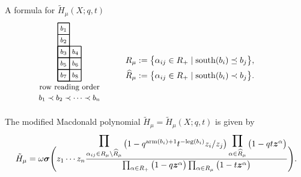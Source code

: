 \documentclass[dvipsnames]{beamer}
\newcommand{\zz}{{\boldsymbol z}}
\newcommand{\sigmabold}{\boldsymbol \sigma}
\newcommand{\Htild}{\tilde{H}}
\DeclareMathOperator{\pol}{pol}
\newcommand{\south}{{\mathrm{south}}}
\newcommand{\leg}{{\mathrm{leg}}}
\newcommand{\arm}{{\mathrm{arm}}}
\theoremstyle{definition}
\begin{document}
\begin{frame}{A formula for \(\Htild_\mu(X;q,t)\)}
  \begin{align*}
\quad \ \ \
\begin{tikzpicture}[scale = .49]
\begin{scope}
\draw[thick] (0,0) grid (1,5);
\draw[thick] (0,0) grid (2,3);
\node at (0.5, 4.5) { \footnotesize $b_1$};
\node at (0.5, 3.5) { \footnotesize $b_2$};
\node at (0.5, 2.5) { \footnotesize $b_3$};
\node at (1.5, 2.5) { \footnotesize $b_4$};
\node at (0.5, 1.5) { \footnotesize $b_5$};
\node at (1.5, 1.5) { \footnotesize $b_6$};
\node at (0.5, 0.5) { \footnotesize $b_7$};
\node at (1.5, 0.5) { \footnotesize $b_8$};
\node at (1,-.54) {\small row reading order };
\node at (1,-1.44) {\small $b_1 \prec b_2 \prec \cdots  \prec b_n$};
\end{scope}
\end{tikzpicture}
\quad  \quad \ \
\raisebox{14mm}{\parbox{7cm}{
 $R_\mu     :=     \big\{ \alpha_{ij} \in R_+ \mid  \south(b_i) \preceq  b_j \big\},$ \\[1.4mm]
$\widehat{R}_\mu  :=  \big\{ \alpha_{ij} \in R_+ \mid  \south(b_i) \prec b_j \big\}$.}}
\end{align*}

\vspace{-4.3mm}
\pause
\begin{theorem}
The modified Macdonald polynomial $\Htild_\mu = \Htild_{\mu }(X;q,t)$ is given by
\vspace{-1mm}
{\small \begin{align*}
          \Htild_\mu =
          \omega \sigmabold \Bigg( z_1 \cdots z_n
\frac{
\displaystyle\prod_{\alpha_{ij} \in R_\mu \setminus \widehat{R}_\mu }
 \raisebox{-1.4mm}{$\big(1- q^{\arm(b_i)+1} t^{-\leg(b_i)} z_i/z_j \big)$}
\displaystyle\prod_{\alpha \in \widehat{R}_{\mu}}
 \raisebox{-1.4mm}{$\big(1-q  t\zz^\alpha \big)$} } {\prod_{\alpha \in R_+} \big(1-q  \zz^\alpha\big)
\prod_{\alpha \in R_\mu} \big(1-t  \zz^\alpha\big)} 
           \Bigg).
\end{align*}}
%
\end{theorem}
\end{frame}
\end{document}

